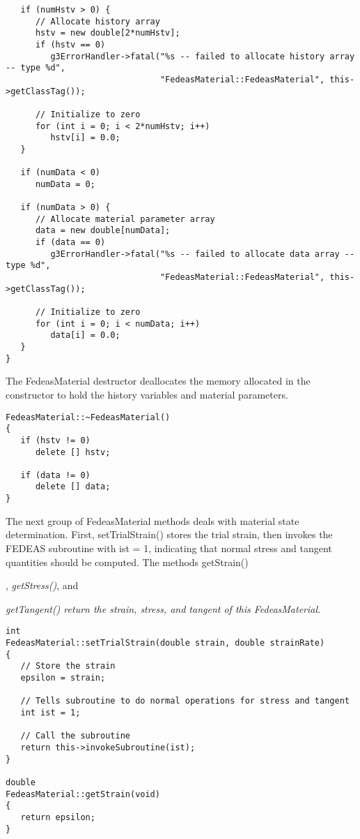\documentclass[12pt]{article}
\begin{document}
{{\begin{verbatim}
   if (numHstv > 0) {
      // Allocate history array
      hstv = new double[2*numHstv];
      if (hstv == 0)
         g3ErrorHandler->fatal("%s -- failed to allocate history array -- type %d",
                               "FedeasMaterial::FedeasMaterial", this->getClassTag());

      // Initialize to zero
      for (int i = 0; i < 2*numHstv; i++)
         hstv[i] = 0.0;
   }
     
   if (numData < 0)
      numData = 0;
     
   if (numData > 0) {
      // Allocate material parameter array
      data = new double[numData];
      if (data == 0)
         g3ErrorHandler->fatal("%s -- failed to allocate data array -- type %d",
                               "FedeasMaterial::FedeasMaterial", this->getClassTag());

      // Initialize to zero
      for (int i = 0; i < numData; i++)
         data[i] = 0.0;
   }
}
\end{verbatim}
}

\noindent The FedeasMaterial destructor deallocates the memory allocated in the constructor
to hold the history variables and material parameters.

{\sf\small
\begin{verbatim}
FedeasMaterial::~FedeasMaterial()
{
   if (hstv != 0)
      delete [] hstv;
     
   if (data != 0)
      delete [] data;
}
\end{verbatim}
}

\noindent The next group of FedeasMaterial methods deals with material state determination.
First, setTrialStrain() stores the trial strain, then invokes the FEDEAS
subroutine with ist = 1, indicating that normal stress and tangent quantities should
be computed. The methods getStrain()}, {\em getStress()}, and {\em getTangent()
return the strain, stress, and tangent of this FedeasMaterial.

{\sf\small
\begin{verbatim}
int
FedeasMaterial::setTrialStrain(double strain, double strainRate)
{
   // Store the strain
   epsilon = strain;
     
   // Tells subroutine to do normal operations for stress and tangent
   int ist = 1;
     
   // Call the subroutine
   return this->invokeSubroutine(ist);
}

double
FedeasMaterial::getStrain(void)
{
   return epsilon;
}


\end{verbatim}}}
\end{document}
